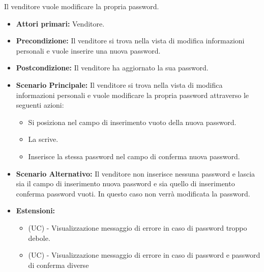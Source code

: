Il venditore vuole modificare la propria password.
\begin{itemize}
    \item \textbf{Attori primari:} Venditore.
    \item \textbf{Precondizione:} Il venditore si trova nella vista di modifica informazioni personali e vuole inserire una nuova password.
    \item \textbf{Postcondizione:} Il venditore ha aggiornato la sua password.
    \item \textbf{Scenario Principale:} Il venditore si trova nella vista di modifica informazioni personali e vuole modificare la propria password attraverso le seguenti azioni:
        \begin{itemize}
            \item Si posiziona nel campo di inserimento vuoto della nuova password.
            \item La scrive.
            \item Inserisce la stessa password nel campo di conferma nuova password.
        \end{itemize}
    \item \textbf{Scenario Alternativo:} Il venditore non inserisce nessuna password e lascia sia il campo di inserimento nuova password e sia quello di inserimento conferma password vuoti. In questo caso non verrà modificata la password.
    \item \textbf{Estensioni:}
    \begin{itemize}
        \item (UC) - Visualizzazione messaggio di errore in caso di password troppo debole.
        \item (UC) - Visualizzazione messaggio di errore in caso di password e password di conferma diverse
    \end{itemize}
\end{itemize}

